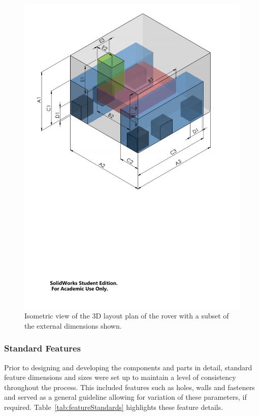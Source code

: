       \begin{figure}[h!]
        \centering
        \includegraphics[clip, trim=1cm 11cm 1cm 0cm, width=0.9\linewidth]{figures/mechDesign-layoutPlan}
        \caption[Isometric view of the 3D layout plan of the rover with a subset of the external dimensions shown.]{Isometric view of the 3D layout plan of the rover with a subset of the external dimensions shown.}
        \label{fig:mechDesign-layoutPlan}
      \end{figure}

      
    \subsubsection{Standard Features}
      Prior to designing and developing the components and parts in detail, standard feature dimensions and sizes were set up to maintain a level of consistency throughout the process. This included features such as holes, walls and fasteners and served as a general guideline allowing for variation of these parameters, if required. Table~\ref{tab:featureStandards} highlights these feature details.
      
